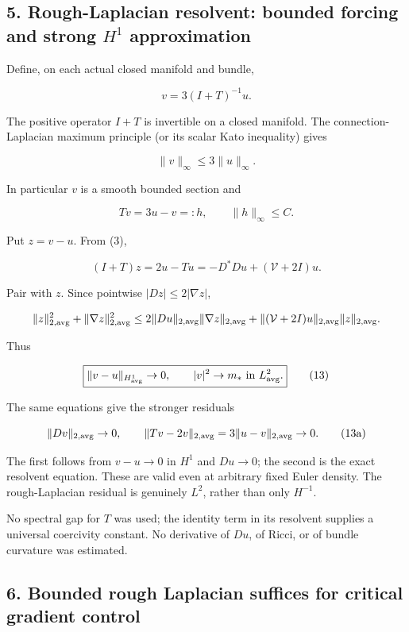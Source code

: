 \hypertarget{o10critical:rough-laplacian-resolvent-bounded-forcing-and-strong-h1-approximation}{%
\subsection{\texorpdfstring{5. Rough-Laplacian resolvent: bounded
forcing and strong \(H^1\)
approximation}{5. Rough-Laplacian resolvent: bounded forcing and strong H\^{}1 approximation}}\label{o10critical:rough-laplacian-resolvent-bounded-forcing-and-strong-h1-approximation}}

Define, on each actual closed manifold and bundle,

\[
 v=3(I+T)^{-1}u.
\tag{10}
\]

The positive operator \(I+T\) is invertible on a closed manifold. The
connection-Laplacian maximum principle (or its scalar Kato inequality)
gives

\[
 \|v\|_\infty\le3\|u\|_\infty.
\tag{11}
\]

In particular \(v\) is a smooth bounded section and

\[
 Tv=3u-v=:h,\qquad \|h\|_\infty\le C.
\tag{12}
\]

Put \(z=v-u\). From (3),

\[
 (I+T)z=2u-Tu=-D^*Du+(\mathcal V+2I)u.
\]

Pair with \(z\). Since pointwise \(|Dz|\le2|\nabla z|\),

\[
 \|z\|_{2,\rm avg}^2+\|\nabla z\|_{2,\rm avg}^2
 \le2\|Du\|_{2,\rm avg}\|\nabla z\|_{2,\rm avg}
 +\|(\mathcal V+2I)u\|_{2,\rm avg}\|z\|_{2,\rm avg}.
\]

Thus

\[
 \boxed{\|v-u\|_{H^1_{\rm avg}}\to0,\qquad
               |v|^2\to m_*\text{ in }L^2_{\rm avg}.}\tag{13}
\]

The same equations give the stronger residuals

\[
 \|Dv\|_{2,\rm avg}\to0,\qquad
 \|Tv-2v\|_{2,\rm avg}=3\|u-v\|_{2,\rm avg}\to0.\tag{13a}
\]

The first follows from \(v-u\to0\) in \(H^1\) and \(Du\to0\); the second
is the exact resolvent equation. These are valid even at arbitrary fixed
Euler density. The rough-Laplacian residual is genuinely \(L^2\), rather
than only \(H^{-1}\).

No spectral gap for \(T\) was used; the identity term in its resolvent
supplies a universal coercivity constant. No derivative of \(Du\), of
Ricci, or of bundle curvature was estimated.

\hypertarget{o10critical:bounded-rough-laplacian-suffices-for-critical-gradient-control}{%
\subsection{6. Bounded rough Laplacian suffices for critical gradient
control}\label{o10critical:bounded-rough-laplacian-suffices-for-critical-gradient-control}}

